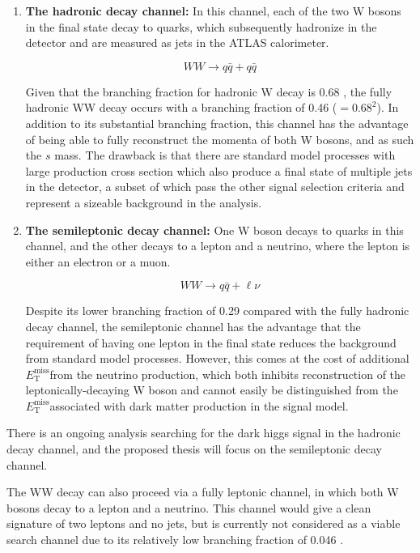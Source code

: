 \documentclass[12pt]{article}
\newcommand*{\met}{\ensuremath{E_\text{T}^\text{miss}}}
\begin{document}
\begin{enumerate}

\item \textbf{The hadronic decay channel:} In this channel, each of the two W bosons in the final state decay to quarks, which subsequently hadronize in the detector and are measured as jets in the ATLAS calorimeter.

\begin{equation}
\nonumber
WW \rightarrow q\bar{q}+q\bar{q}
\end{equation}

Given that the branching fraction for hadronic W decay is 0.68 \cite{PDG}, the fully hadronic WW decay occurs with a branching fraction of 0.46 ($=0.68^2$). In addition to its substantial branching fraction, this channel has the advantage of being able to fully reconstruct the momenta of both W bosons, and as such the $s$ mass. The drawback is that there are standard model processes with large production cross section which also produce a final state of multiple jets in the detector, a subset of which pass the other signal selection criteria and represent a sizeable background in the analysis. 

\item \textbf{The semileptonic decay channel:} One W boson decays to quarks in this channel, and the other decays to a lepton and a neutrino, where the lepton is either an electron or a muon. 

\begin{equation}
\nonumber
WW \rightarrow q\bar{q}+\ell\nu
\end{equation}

Despite its lower branching fraction of 0.29 \cite{PDG} compared with the fully hadronic decay channel, the semileptonic channel has the advantage that the requirement of having one lepton in the final state reduces the background from standard model processes. However, this comes at the cost of additional \met from the neutrino production, which both inhibits reconstruction of the leptonically-decaying W boson and cannot easily be distinguished from the \met associated with dark matter production in the signal model. 

\end{enumerate}

There is an ongoing analysis searching for the dark higgs signal in the hadronic decay channel, and the proposed thesis will focus on the semileptonic decay channel. 

The WW decay can also proceed via a fully leptonic channel, in which both W bosons decay to a lepton and a neutrino. This channel would give a clean signature of two leptons and no jets, but is currently not considered as a viable search channel due to its relatively low branching fraction of 0.046 \cite{PDG}.
\end{document}
